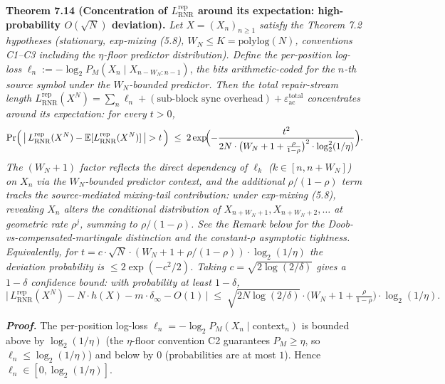\documentclass[
]{article}
\begin{document}
\textbf{Theorem 7.14 (Concentration of $L^{\mathrm{rep}}_{\mathrm{RNR}}$
around its expectation: high-probability $O(\sqrt{N})$ deviation).}
\emph{Let $X = (X_n)_{n \geq 1}$ satisfy the Theorem 7.2 hypotheses
(stationary, exp-mixing (5.8), $W_N \leq K = \mathrm{polylog}(N)$,
conventions C1--C3 including the $\eta$-floor predictor distribution).
Define the per-position log-loss}
$\ell_n := -\log_2 P_M(X_n \mid X_{n-W_N : n-1})$,
\emph{the bits arithmetic-coded for the $n$-th source symbol under the
$W_N$-bounded predictor. Then the total repair-stream length
$L^{\mathrm{rep}}_{\mathrm{RNR}}(X^N) = \sum_n \ell_n + (\text{sub-block
sync overhead}) + \varepsilon_{\mathrm{ac}}^{\mathrm{total}}$
concentrates around its expectation: for every $t > 0$,}
\[
\Pr\Bigl(\,\bigl|\,L^{\mathrm{rep}}_{\mathrm{RNR}}(X^N) - \mathbb{E}[L^{\mathrm{rep}}_{\mathrm{RNR}}(X^N)]\,\bigr| > t\,\Bigr)
\;\leq\;
2 \exp\!\Bigl(-\frac{t^2}{2 N \cdot \bigl(W_N + 1 + \tfrac{\rho}{1-\rho}\bigr)^2 \cdot \log_2^2(1/\eta)}\Bigr).
\]
\emph{The $(W_N+1)$ factor reflects the direct dependency of $\ell_k$
($k \in [n, n+W_N]$) on $X_n$ via the $W_N$-bounded predictor context,
and the additional $\rho/(1-\rho)$ term tracks the source-mediated
mixing-tail contribution: under exp-mixing (5.8), revealing $X_n$
alters the conditional distribution of $X_{n+W_N+1}, X_{n+W_N+2}, \ldots$
at geometric rate $\rho^j$, summing to $\rho/(1-\rho)$. See the
Remark below for the Doob-vs-compensated-martingale distinction
and the constant-$\rho$ asymptotic tightness.
Equivalently, for $t = c \cdot \sqrt{N} \cdot (W_N + 1 + \rho/(1-\rho))
\cdot \log_2(1/\eta)$ the deviation probability is $\leq 2 \exp(-c^2/2)$.
Taking $c = \sqrt{2\log(2/\delta)}$ gives a $1 - \delta$ confidence
bound: with probability at least $1 - \delta$,}
\[
\bigl|\,L^{\mathrm{rep}}_{\mathrm{RNR}}(X^N) - N \cdot h(X) - m \cdot \delta_\infty - O(1)\,\bigr|
\;\leq\;
\sqrt{2 N \log(2/\delta)} \cdot \bigl(W_N + 1 + \tfrac{\rho}{1-\rho}\bigr) \cdot \log_2(1/\eta).
\]

\emph{\textbf{Proof.}} The per-position log-loss
$\ell_n = -\log_2 P_M(X_n \mid \text{context}_n)$ is bounded above by
$\log_2(1/\eta)$ (the $\eta$-floor convention C2 guarantees
$P_M \geq \eta$, so $\ell_n \leq \log_2(1/\eta)$) and below by $0$
(probabilities are at most $1$). Hence $\ell_n \in [0, \log_2(1/\eta)]$.
\end{document}
